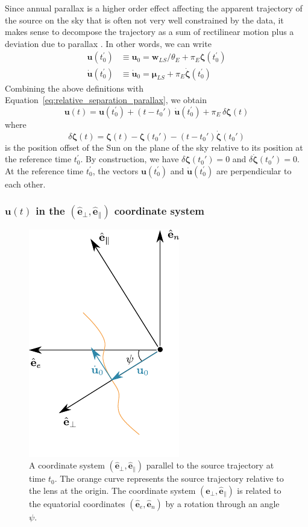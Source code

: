 \documentclass[12pt,dvipsnames]{report}
\renewcommand{\vec}[1]{\boldsymbol{\mathbf{#1}}}
\begin{document}
Since annual parallax is a higher order effect affecting the apparent
trajectory of the source on the sky that is often not very well constrained by the data, 
it makes sense to decompose the trajectory as a sum of rectilinear motion plus a deviation 
due to parallax
\citep{2002ApJ...572..521A,2004ApJ...606..319G}. In other words, we can write 
\citep{2002ApJ...572..521A}
\begin{align}
    \vec{u}(t_0^\prime)&\equiv \vec{u}_0=\vec{w}_{LS}/\theta_E+\pi_E\vec{\zeta}(t_0^\prime)\\
    \dot{\vec u}(t_0^\prime)&\equiv \dot{\vec u}_0=\vec{\mu}_{LS}+\pi_E\dot{\vec{\zeta}}(t_0^\prime)
\end{align}
Combining the above definitions with Equation~\ref{eq:relative_separation_parallax}, we obtain
\begin{equation}
    \boldsymbol{u}(t)=\mathbf{u}(t_0^\prime) + (t-t_0')\,\dot{\vec{u}}(t_0^\prime) +
    \pi_E\,\delta\vec\zeta(t)
\end{equation}
where 
\begin{equation}
    \delta\boldsymbol \zeta (t)=\boldsymbol \zeta (t)-\boldsymbol \zeta (t_0')-(t-t_0')
    \boldsymbol{\dot \zeta} (t_0')
    \label{eq:relative_separation_parallax_decomposed}
\end{equation}
is the position offset of the Sun on the plane of the sky relative to its position 
at the reference time $t_0^\prime$. By construction, we have 
$\delta\boldsymbol \zeta (t_0')=0$ and $\delta\dot{\boldsymbol \zeta} (t_0')=0$.
At the reference time $t_0^\prime$, the vectors $\vec{u}(t_0^\prime)$ and 
$\dot{\vec u}(t_0^\prime)$ are perpendicular to each other.

\subsubsection{$\mathbf{u}(t)$ in the $(\mathbf{\hat e}_\bot,
        \mathbf{\hat e}_\parallel)$ coordinate system}%

\begin{figure}
    \centering
    \includegraphics[width=0.3\linewidth]{../static/microlensing/microlensing_parallax_coordinates.pdf}
    \caption{A coordinate system
        $(\mathbf{\hat e}_\bot,\mathbf{\hat e}_\parallel)$ parallel to the source trajectory at time $t_0$. The orange curve
        represents the source trajectory relative to the lens at the origin. The
        coordinate system $(\mathbf{\hat e}_\bot,\mathbf{\hat e}_\parallel)$ is related to the equatorial coordinates $(\mathbf{\hat
                e}_e,\mathbf{\hat e}_n)$ by a rotation through an angle $\psi$.}
    \label{fig:parallax2}
\end{figure}
\end{document}
